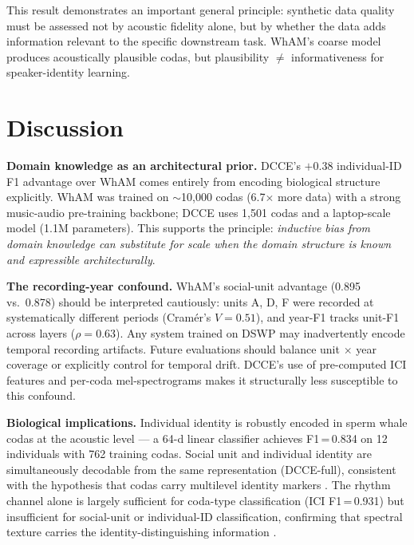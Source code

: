 \documentclass[9pt,a4paper,twocolumn,twoside]{rho-class/rho}
\begin{document}
This result demonstrates an important general principle: synthetic data quality must be assessed not by acoustic fidelity alone, but by whether the data adds information relevant to the specific downstream task. WhAM's coarse model produces acoustically plausible codas, but plausibility $\neq$ informativeness for speaker-identity learning.

\section{Discussion}
\label{sec:discussion}

\textbf{Domain knowledge as an architectural prior.} DCCE's $+$0.38 individual-ID F1 advantage over WhAM comes entirely from encoding biological structure explicitly. WhAM was trained on $\sim$10,000 codas (6.7$\times$ more data) with a strong music-audio pre-training backbone; DCCE uses 1,501 codas and a laptop-scale model (1.1M parameters). This supports the principle: \emph{inductive bias from domain knowledge can substitute for scale when the domain structure is known and expressible architecturally}.

\textbf{The recording-year confound.} WhAM's social-unit advantage (0.895 vs.\ 0.878) should be interpreted cautiously: units A, D, F were recorded at systematically different periods (Cram\'{e}r's $V=0.51$), and year-F1 tracks unit-F1 across layers ($\rho=0.63$). Any system trained on DSWP may inadvertently encode temporal recording artifacts. Future evaluations should balance unit $\times$ year coverage or explicitly control for temporal drift. DCCE's use of pre-computed ICI features and per-coda mel-spectrograms makes it structurally less susceptible to this confound.

\textbf{Biological implications.} Individual identity is robustly encoded in sperm whale codas at the acoustic level --- a 64-d linear classifier achieves F1\,=\,0.834 on 12 individuals with 762 training codas. Social unit and individual identity are simultaneously decodable from the same representation (DCCE-full), consistent with the hypothesis that codas carry multilevel identity markers \cite{gero2016identity}. The rhythm channel alone is largely sufficient for coda-type classification (ICI F1\,=\,0.931) but insufficient for social-unit or individual-ID classification, confirming that spectral texture carries the identity-distinguishing information \cite{begus2024vowels}.
\end{document}
